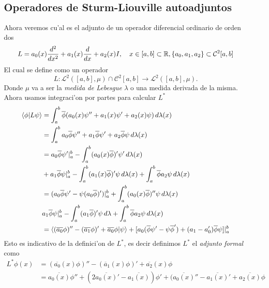 \documentclass[main.tex]{subfiles}
\begin{document}
\subsection{Operadores de Sturm-Liouville autoadjuntos}
\noindent Ahora veremos cu'al es el adjunto de un operador diferencial ordinario de orden dos
\[
L=a_0(x)\frac{d^2}{dx^2}+a_1(x)\frac{d}{dx}+a_2(x)I,\quad x\in [a,b]\subset\mathbb R ,\{a_{0},a_{1},a_{2}\}\subset\mathcal{C}^{2}[a,b]
\]
El cual se define como un operador
\[
  L:\mathcal{L}^{2}([a,b],\mu)\cap\mathcal{C}^{2}[a,b]\to\mathcal{L}^{2}([a,b],\mu).
\]
\noindent Donde $\mu$ va a ser la \emph{medida de Lebesgue} $\lambda$ o una medida derivada de la misma. Ahora usamos integraci'on por partes para calcular $L^{*}$
\begin{align*}
  \braket{\phi|L\psi}&=\int_{a}^{b}\overline{\phi}(a_{0}(x)\psi''+a_{1}(x)\psi'+a_{2}(x)\psi)\,d\lambda(x)\\
                     &=\int_{a}^{b}a_{0}\overline{\phi}\psi''+a_{1}\overline{\phi}\psi'+a_{2}\overline{\phi}\psi\,d\lambda(x)\\
                     &=a_{0}\overline{\phi}\psi'|_{a}^{b}-\int_{a}^{b}(a_{0}(x)\overline{\phi})'\psi'\,d\lambda(x)\\
                     &+a_{1}\overline{\phi}\psi|_{a}^{b}-\int_{a}^{b}(a_{1}(x)\overline{\phi})'\psi\,d\lambda(x)
                     +\int_{a}^{b}\overline{\phi}a_{2}\psi\,d\lambda(x)\\
                     &=(a_{0}\overline{\phi}\psi'-\psi(a_{0}\overline{\phi})')|_{a}^{b} +\int_{a}^{b}(a_{0}(x)\overline{\phi})''\psi\,d\lambda(x)\\
                     &a_{1}\overline{\phi}\psi|_{a}^{b}-\int_{a}^{b}(a_{1}\overline{\phi})'\psi\,d\lambda
                       +\int_{a}^{b}\overline{\phi}a_{2}\psi\,d\lambda(x)\\
                     &=\braket{(\overline{a_{0}}\phi)''-(\overline{a_{1}}\phi)'+\overline{a_{0}}\phi|\psi}+
                       [a_{0}(\overline{\phi}\psi'-\psi\overline{\phi}')+(a_{1}-a_{0}')\overline{\phi}\psi]|_{a}^{b}
\end{align*}
Esto es indicativo de la definici'on de $L^{*}$, es decir definimos $L^{*}$ el \emph{adjunto formal} como
\begin{align*}
  L^{*}\phi(x)&=(\overline{a_{0}}(x)\phi)''-(\overline{a}_{1}(x)\phi)'+\overline{a_{2}}(x)\phi\\
             &=\overline{a_{0}(x)}\phi''+(2\overline{a_{0}(x)}'-\overline{a_{1}(x)})\phi'+(\overline{a_{0}(x)}''-\overline{a_{1}(x)}'+\overline{a_{2}(x)}\phi
\end{align*}
\end{document}
